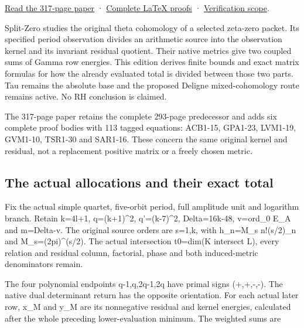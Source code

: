 \documentclass[
]{article}
\begin{document}
\href{https://github.com/KokunoYumeto/zeta-function-research-reader/blob/main/workbenches/splitzero-tandem/continuations/20260915-allocation-continuation/15_CURRENT_MIXED_CONTROL_READER.pdf}{Read
the 317-page paper} ·
\href{https://github.com/KokunoYumeto/zeta-function-research-reader/blob/main/workbenches/splitzero-tandem/continuations/20260915-allocation-continuation/14_CURRENT_KERNEL_AND_MULTIPLICITY_PROOFS.tex}{Complete
LaTeX proofs} ·
\href{https://github.com/KokunoYumeto/zeta-function-research-reader/blob/main/workbenches/splitzero-tandem/continuations/20260915-allocation-continuation/12_VALIDATION.md}{Verification
scope}.

Split-Zero studies the original theta cohomology of a selected zeta-zero
packet. Its specified period observation divides an arithmetic source
into the observation kernel and its invariant residual quotient. Their
native metrics give two coupled sums of Gamma row energies. This edition
derives finite bounds and exact matrix formulas for how the already
evaluated total is divided between those two parts. Tau remains the
absolute base and the proposed Deligne mixed-cohomology route remains
active. No RH conclusion is claimed.

The 317-page paper retains the complete 293-page predecessor and adds
six complete proof bodies with 113 tagged equations: ACB1-15, GPA1-23,
LVM1-19, GVM1-10, TSR1-30 and SAR1-16. These concern the same original
kernel and residual, not a replacement positive matrix or a freely
chosen metric.

\subsection{The actual allocations and their exact
total}\label{the-actual-allocations-and-their-exact-total}

Fix the actual simple quartet, five-orbit period, full amplitude unit
and logarithm branch. Retain k=4l+1, q=(k+1)\^{}2, q'=(k-7)\^{}2,
Delta=16k-48, v=ord\_0 E\_A and m=Delta-v. The original source orders
are s=1,k, with h\_n=M\_s n!(s/2)\_n and M\_s=(2pi)\^{}(s/2). The actual
intersection t0=dim(K intersect L), every relation and residual column,
factorial, phase and both induced-metric denominators remain.

The four polynomial endpoints q-1,q,2q-1,2q have primal signs (+,+,-,-).
The native dual determinant return has the opposite orientation. For
each actual later row, x\_M and y\_M are its nonnegative residual and
kernel energies, calculated after the whole preceding lower-evaluation
minimum. The weighted sums are
\end{document}
